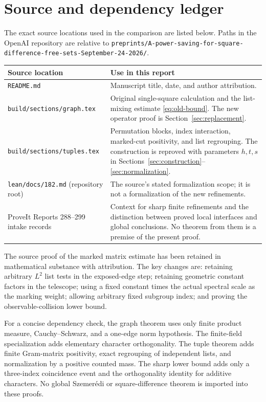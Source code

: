 \documentclass[11pt,a4paper]{article}
\numberwithin{equation}{section}
\theoremstyle{definition}
\theoremstyle{remark}
\begin{document}
\appendix
\section{Source and dependency ledger}

The exact source locations used in the comparison are listed below.
Paths in the OpenAI repository are relative to
\nolinkurl{preprints/A-power-saving-for-square-difference-free-sets-September-24-2026/}.

\begin{table}[htbp]
\centering\small
\begin{tabularx}{\textwidth}{@{}lX@{}}
\toprule
Source location & Use in this report\\
\midrule
\texttt{README.md} & Manuscript title, date, and author attribution.\\
\texttt{build/sections/graph.tex} & Original single-square calculation and
  the list-mixing estimate \eqref{eq:old-bound}. The new operator proof
  is Section~\ref{sec:replacement}.\\
\texttt{build/sections/tuples.tex} & Permutation blocks, index interaction,
  marked-cut positivity, and list regrouping. The construction is
  reproved with parameters $h,t,s$ in Sections~\ref{sec:construction}--\ref{sec:normalization}.\\
\texttt{lean/docs/182.md} (repository root) & The source's stated
  formalization scope; it is not a formalization of the new refinements.\\
ProveIt Reports 288--299 intake records & Context for sharp finite
  refinements and the distinction between proved local interfaces and
  global conclusions. No theorem from them is a premise of the present proof.\\
\bottomrule
\end{tabularx}
\end{table}

The source proof of the marked matrix estimate has been retained in
mathematical substance with attribution. The key changes are: retaining
arbitrary $L^2$ list tests in the exposed-edge step; retaining geometric
constant factors in the telescope; using a fixed constant times the
actual spectral scale as the marking weight; allowing arbitrary fixed
subgroup index; and proving the observable-collision lower bound.

For a concise dependency check, the graph theorem uses only finite
product measure, Cauchy--Schwarz, and a one-edge norm hypothesis.
The finite-field specialization adds elementary character orthogonality.
The tuple theorem adds finite Gram-matrix positivity, exact regrouping
of independent lists, and normalization by a positive counted mass.
The sharp lower bound adds only a three-index coincidence event and
the orthogonality identity for additive characters. No global
Szemer\'edi or square-difference theorem is imported into these proofs.
\end{document}
